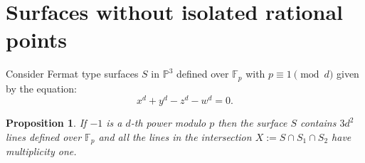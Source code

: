 \documentclass[12pt]{amsart}
\newtheorem{proposition}[lemma]{Proposition}
\theoremstyle{definition}
\begin{document}


\section{Surfaces without isolated rational points}

Consider Fermat type surfaces $S$ in ${\mathbb P}^3$ defined over ${\mathbb F}_p$ with $p\equiv 1\pmod d$ given by the equation:
$$x^d + y^d -z^d -w^d=0.$$



\begin{proposition}\label{Number_Lines}
If $-1$ is a $d$-th power modulo $p$ then the  surface $S$ contains $3d^2$ lines defined over ${\mathbb F}_p$ and
all the lines in the intersection $X:=S\cap S_1 \cap S_2$ have multiplicity one.
\end{proposition}
\end{document}

